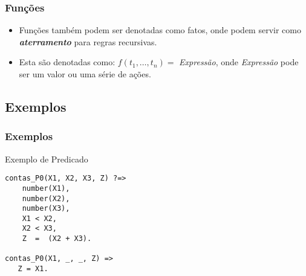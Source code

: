 \begin{frame}[fragile]
	\frametitle{Funções}
    
    \begin{itemize}
    
        \item Funções também podem ser denotadas como fatos, onde podem servir como 
        \textbf{\textit{aterramento}} para regras recursivas.
        
        
        \item Esta são denotadas como: $f(t_1,\ldots,t_n) = $ \emph{Expressão}, onde \textit{Expressão}
        pode ser um valor ou uma série de ações.
        
    \end{itemize}
    
\end{frame}


\subsection{Exemplos}

\begin{frame}[fragile]

\frametitle{Exemplos}

\begin{block}{Exemplo de Predicado}
   
\begin{lstlisting}[frame=single]
contas_P0(X1, X2, X3, Z) ?=>
    number(X1),
    number(X2),
    number(X3),
    X1 < X2,
    X2 < X3,
    Z  =  (X2 + X3).
    
contas_P0(X1, _, _, Z) =>
   Z = X1.    
\end{lstlisting}
    \end{block}

        
\end{frame}

